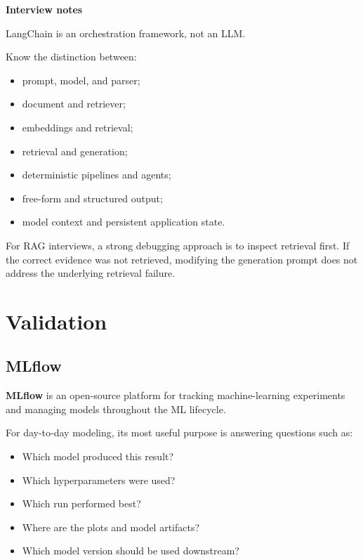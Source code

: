 \documentclass[11pt,letterpaper]{article}
\begin{document}
\textbf{Interview notes}

LangChain is an orchestration framework, not an LLM.

Know the distinction between:

\begin{itemize}[leftmargin=*]
    \item prompt, model, and parser;
    \item document and retriever;
    \item embeddings and retrieval;
    \item retrieval and generation;
    \item deterministic pipelines and agents;
    \item free-form and structured output;
    \item model context and persistent application state.
\end{itemize}

For RAG interviews, a strong debugging approach is to inspect retrieval first.
If the correct evidence was not retrieved, modifying the generation prompt
does not address the underlying retrieval failure.



\section{Validation}


\subsection{MLflow}

\textbf{MLflow} is an open-source platform for tracking machine-learning
experiments and managing models throughout the ML lifecycle.

For day-to-day modeling, its most useful purpose is answering questions such
as:

\begin{itemize}[leftmargin=*]
    \item Which model produced this result?
    \item Which hyperparameters were used?
    \item Which run performed best?
    \item Where are the plots and model artifacts?
    \item Which model version should be used downstream?
\end{itemize}
\end{document}
